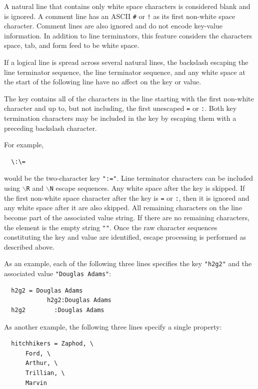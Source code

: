 \documentclass[a4paper,fleqn]{report}
\begin{document}
A natural line that contains only white space characters is considered
blank and is ignored. A comment line has an ASCII \texttt{\#} or
\texttt{!} as its first non-white space character. Comment lines are
also ignored and do not encode key-value information. In addition to
line terminators, this feature considers the characters space, tab,
and form feed to be white space.

If a logical line is spread across several natural lines, the
backslash escaping the line terminator sequence, the line terminator
sequence, and any white space at the start of the following line have
no affect on the key or value.

The key contains all of the characters in the line starting with the
first non-white character and up to, but not including, the first
unescaped \texttt{=} or \texttt{:}. Both key termination characters
may be included in the key by escaping them with a preceding backslash
character.

\pagebreak

For example,

\begin{lstlisting}
  \:\=
\end{lstlisting}

would be the two-character key \texttt{":="}. Line terminator
characters can be included using \texttt{$\backslash$R} and
\texttt{$\backslash$N} escape sequences. Any white space after the key
is skipped. If the first non-white space character after the key is
\texttt{=} or \texttt{:}, then it is ignored and any white space after
it are also skipped. All remaining characters on the line become part
of the associated value string. If there are no remaining characters,
the element is the empty string \texttt{""}. Once the raw character
sequences constituting the key and value are identified, escape
processing is performed as described above.

As an example, each of the following three lines specifies the key
\texttt{"h2g2"} and the associated value \texttt{"Douglas Adams"}:

\begin{lstlisting}
  h2g2 = Douglas Adams
            h2g2:Douglas Adams
  h2g2        :Douglas Adams  
\end{lstlisting}

As another example, the following three lines specify a single
property:

\begin{lstlisting}
  hitchhikers = Zaphod, \
      Ford, \
      Arthur, \
      Trillian, \
      Marvin  
\end{lstlisting}
\end{document}
